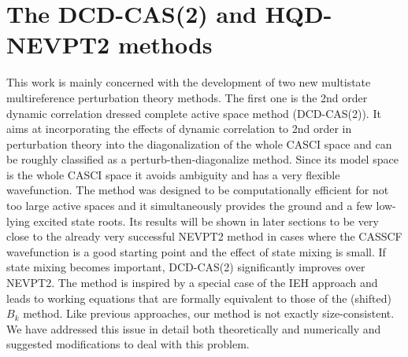 \section{The DCD-CAS(2) and HQD-NEVPT2 methods}
This work is mainly concerned with the development of two new multistate multireference perturbation theory methods. The first one is the 2nd order dynamic correlation dressed complete active space method (DCD-CAS(2)).\cite{PathaLN_2017_234109, LangN_2019_104104} It aims at incorporating the effects of dynamic correlation to 2nd order in perturbation theory into the diagonalization of the whole CASCI space and can be roughly classified as a perturb-then-diagonalize method. Since its model space is the whole CASCI space it avoids ambiguity and has a very flexible wavefunction. The method was designed to be computationally efficient for not too large active spaces and it simultaneously provides the ground and a few low-lying excited state roots. Its results will be shown in later sections to be very close to the already very successful NEVPT2 method in cases where the CASSCF wavefunction is a good starting point and the effect of state mixing is small. If state mixing becomes important, DCD-CAS(2) significantly improves over NEVPT2. The method is inspired by a special case of the IEH approach\cite{MalriDD_1985_809} and leads to working equations that are formally equivalent to those of the (shifted) $B_k$ method. Like previous approaches,\cite{DavidMD_1981_5491} our method is not exactly size-consistent. We have addressed this issue in detail both theoretically and numerically and suggested modifications to deal with this problem.\cite{PathaLN_2017_234109}

